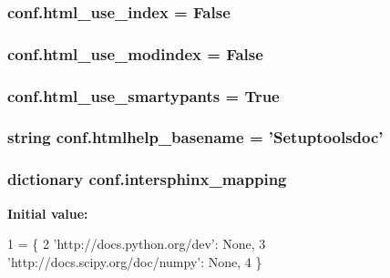 \subsubsection[{html\+\_\+use\+\_\+index}]{\setlength{\rightskip}{0pt plus 5cm}conf.\+html\+\_\+use\+\_\+index = {\bf False}}\label{namespaceconf_af06bd0927581dbe55f99799545d18bd6}
\hypertarget{namespaceconf_a8662adb4015249c70d8a12e9a5f258c8}{}
\subsubsection[{html\+\_\+use\+\_\+modindex}]{\setlength{\rightskip}{0pt plus 5cm}conf.\+html\+\_\+use\+\_\+modindex = {\bf False}}\label{namespaceconf_a8662adb4015249c70d8a12e9a5f258c8}
\hypertarget{namespaceconf_a0543ec4ed2f4f7a56f17b30c2e9e4916}{}
\subsubsection[{html\+\_\+use\+\_\+smartypants}]{\setlength{\rightskip}{0pt plus 5cm}conf.\+html\+\_\+use\+\_\+smartypants = {\bf True}}\label{namespaceconf_a0543ec4ed2f4f7a56f17b30c2e9e4916}
\hypertarget{namespaceconf_a74d707b34bba474e9057f383ad01de83}{}
\subsubsection[{htmlhelp\+\_\+basename}]{\setlength{\rightskip}{0pt plus 5cm}string conf.\+htmlhelp\+\_\+basename = 'Setuptoolsdoc'}\label{namespaceconf_a74d707b34bba474e9057f383ad01de83}
\hypertarget{namespaceconf_a8375f4f963de3ac8026eaa9beced9564}{}
\subsubsection[{intersphinx\+\_\+mapping}]{\setlength{\rightskip}{0pt plus 5cm}dictionary conf.\+intersphinx\+\_\+mapping}\label{namespaceconf_a8375f4f963de3ac8026eaa9beced9564}
{\bfseries Initial value\+:}
\begin{DoxyCode}
1 = \{
2         \textcolor{stringliteral}{'http://docs.python.org/dev'}: \textcolor{keywordtype}{None},
3         \textcolor{stringliteral}{'http://docs.scipy.org/doc/numpy'}: \textcolor{keywordtype}{None},
4 \}
\end{DoxyCode}
\hypertarget{namespaceconf_a00b7896473527f894006130b1113cb4b}{}
